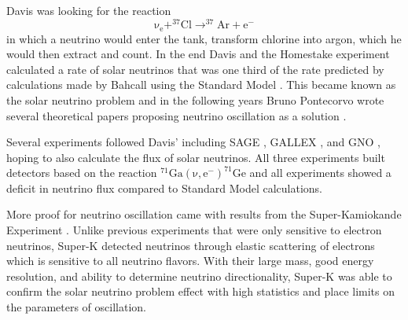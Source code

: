 Davis was looking for the reaction 
\begin{equation}
	\mathrm{\nu _{e}+ ^{37}Cl \rightarrow  ^{37}Ar+e^{-}} 
	\label{eq:ClAr}
\end{equation}
in which a neutrino would enter the tank, transform chlorine into argon, which he would then extract and count.
In the end Davis and the Homestake experiment calculated a rate of solar neutrinos that was one third of the rate predicted by calculations made by Bahcall using the Standard Model \cite{Davis}. 
This became known as the solar neutrino problem and in the following years Bruno Pontecorvo wrote several theoretical papers proposing neutrino oscillation as a solution \cite{Pont1968,Pont1977}.

Several experiments followed Davis' including SAGE \cite{Abdurashitov:1994bc}, GALLEX \cite{Hampel:1998xg}, and GNO \cite{Altmann:2000ft,Bellotti:2001ta}, hoping to also calculate the flux of solar neutrinos.
All three experiments built detectors based on the reaction $\mathrm{^{71}Ga(\nu,e^{-})^{71}Ge}$ and all experiments showed a deficit in neutrino flux compared to Standard Model calculations. 

More proof for neutrino oscillation came with results from the Super-Kamiokande Experiment \cite{SuperKOsc}. Unlike previous experiments that were only sensitive to electron neutrinos, Super-K detected neutrinos through elastic scattering of electrons which is sensitive to all neutrino flavors.
With their large mass, good energy resolution, and ability to determine neutrino directionality, Super-K was able to confirm the solar neutrino problem effect with high statistics and place limits on the parameters of oscillation.


